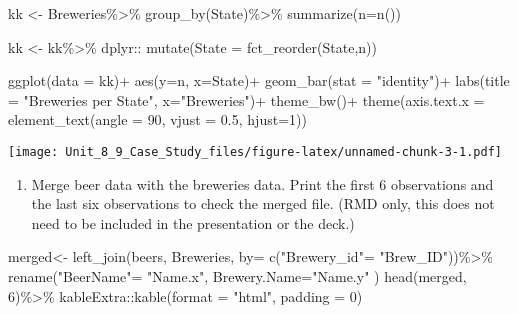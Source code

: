 \documentclass[
]{article}
\newenvironment{Shaded}{\begin{snugshade}}{\end{snugshade}}
\newcommand{\AttributeTok}[1]{\textcolor[rgb]{0.77,0.63,0.00}{#1}}
\newcommand{\DecValTok}[1]{\textcolor[rgb]{0.00,0.00,0.81}{#1}}
\newcommand{\FloatTok}[1]{\textcolor[rgb]{0.00,0.00,0.81}{#1}}
\newcommand{\FunctionTok}[1]{\textcolor[rgb]{0.00,0.00,0.00}{#1}}
\newcommand{\NormalTok}[1]{#1}
\newcommand{\OtherTok}[1]{\textcolor[rgb]{0.56,0.35,0.01}{#1}}
\newcommand{\SpecialCharTok}[1]{\textcolor[rgb]{0.00,0.00,0.00}{#1}}
\newcommand{\StringTok}[1]{\textcolor[rgb]{0.31,0.60,0.02}{#1}}
\providecommand{\tightlist}{%
  \setlength{\itemsep}{0pt}\setlength{\parskip}{0pt}}
\begin{document}
\begin{Shaded}
\begin{Highlighting}[]
\NormalTok{kk }\OtherTok{\textless{}{-}}\NormalTok{ Breweries}\SpecialCharTok{\%\textgreater{}\%}
  \FunctionTok{group\_by}\NormalTok{(State)}\SpecialCharTok{\%\textgreater{}\%}
  \FunctionTok{summarize}\NormalTok{(}\AttributeTok{n=}\FunctionTok{n}\NormalTok{())}
  
\NormalTok{kk }\OtherTok{\textless{}{-}}\NormalTok{ kk}\SpecialCharTok{\%\textgreater{}\%}
\NormalTok{dplyr}\SpecialCharTok{::} \FunctionTok{mutate}\NormalTok{(}\AttributeTok{State =} \FunctionTok{fct\_reorder}\NormalTok{(State,n))}

  \FunctionTok{ggplot}\NormalTok{(}\AttributeTok{data =}\NormalTok{ kk)}\SpecialCharTok{+}
   \FunctionTok{aes}\NormalTok{(}\AttributeTok{y=}\NormalTok{n, }\AttributeTok{x=}\NormalTok{State)}\SpecialCharTok{+}
  \FunctionTok{geom\_bar}\NormalTok{(}\AttributeTok{stat =} \StringTok{"identity"}\NormalTok{)}\SpecialCharTok{+}
  \FunctionTok{labs}\NormalTok{(}\AttributeTok{title =} \StringTok{"Breweries per State"}\NormalTok{,}
       \AttributeTok{x=}\StringTok{"Breweries"}\NormalTok{)}\SpecialCharTok{+}
  \FunctionTok{theme\_bw}\NormalTok{()}\SpecialCharTok{+}
   \FunctionTok{theme}\NormalTok{(}\AttributeTok{axis.text.x =} \FunctionTok{element\_text}\NormalTok{(}\AttributeTok{angle =} \DecValTok{90}\NormalTok{, }\AttributeTok{vjust =} \FloatTok{0.5}\NormalTok{, }\AttributeTok{hjust=}\DecValTok{1}\NormalTok{))}
\end{Highlighting}
\end{Shaded}

\texttt{[image: Unit\_8\_9\_Case\_Study\_files/figure-latex/unnamed-chunk-3-1.pdf]}

\begin{enumerate}
\def\labelenumi{\arabic{enumi}.}
\setcounter{enumi}{1}
\tightlist
\item
  Merge beer data with the breweries data. Print the first 6
  observations and the last six observations to check the merged file.
  (RMD only, this does not need to be included in the presentation or
  the deck.)
\end{enumerate}

\begin{Shaded}
\begin{Highlighting}[]
\NormalTok{merged}\OtherTok{\textless{}{-}} \FunctionTok{left\_join}\NormalTok{(beers, Breweries, }\AttributeTok{by=} \FunctionTok{c}\NormalTok{(}\StringTok{"Brewery\_id"}\OtherTok{=} \StringTok{"Brew\_ID"}\NormalTok{))}\SpecialCharTok{\%\textgreater{}\%}
  \FunctionTok{rename}\NormalTok{(}\StringTok{"BeerName"}\OtherTok{=} \StringTok{"Name.x"}\NormalTok{, }\AttributeTok{Brewery.Name=}\StringTok{"Name.y"}\NormalTok{ )}
\FunctionTok{head}\NormalTok{(merged, }\DecValTok{6}\NormalTok{)}\SpecialCharTok{\%\textgreater{}\%}
\NormalTok{  kableExtra}\SpecialCharTok{::}\FunctionTok{kable}\NormalTok{(}\AttributeTok{format =} \StringTok{"html"}\NormalTok{, }\AttributeTok{padding =} \DecValTok{0}\NormalTok{)}
\end{Highlighting}
\end{Shaded}
\end{document}
